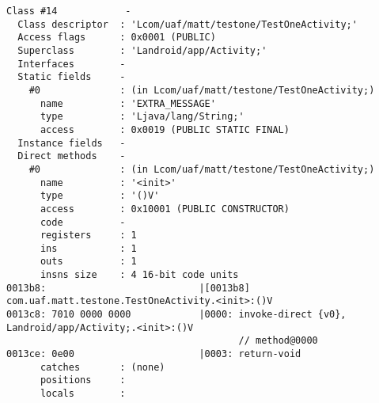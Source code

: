 \begin{lstlisting}
Class #14            -
  Class descriptor  : 'Lcom/uaf/matt/testone/TestOneActivity;'
  Access flags      : 0x0001 (PUBLIC)
  Superclass        : 'Landroid/app/Activity;'
  Interfaces        -
  Static fields     -
    #0              : (in Lcom/uaf/matt/testone/TestOneActivity;)
      name          : 'EXTRA_MESSAGE'
      type          : 'Ljava/lang/String;'
      access        : 0x0019 (PUBLIC STATIC FINAL)
  Instance fields   -
  Direct methods    -
    #0              : (in Lcom/uaf/matt/testone/TestOneActivity;)
      name          : '<init>'
      type          : '()V'
      access        : 0x10001 (PUBLIC CONSTRUCTOR)
      code          -
      registers     : 1
      ins           : 1
      outs          : 1
      insns size    : 4 16-bit code units
0013b8:                           |[0013b8] com.uaf.matt.testone.TestOneActivity.<init>:()V
0013c8: 7010 0000 0000            |0000: invoke-direct {v0}, Landroid/app/Activity;.<init>:()V
                                         // method@0000
0013ce: 0e00                      |0003: return-void
      catches       : (none)
      positions     :
      locals        :


\end{lstlisting}

